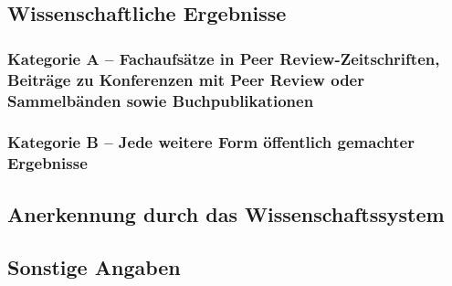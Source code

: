 \documentclass{scrartcl}
\begin{document}
\subsection*{Wissenschaftliche Ergebnisse}
\nocite{*}

\subsubsection*{Kategorie A -- Fachaufsätze in Peer Review-Zeitschriften, Beiträge zu Konferenzen mit Peer Review oder Sammelbänden sowie Buchpublikationen}
\printbibliography[category=reviewed, heading=none]

\subsubsection*{Kategorie B -- Jede weitere Form öffentlich gemachter Ergebnisse}
\printbibliography[category=nonreviewed, heading=none, resetnumbers=true]

\subsection*{Anerkennung durch das Wissenschaftssystem}

\subsection*{Sonstige Angaben}
\end{document}
